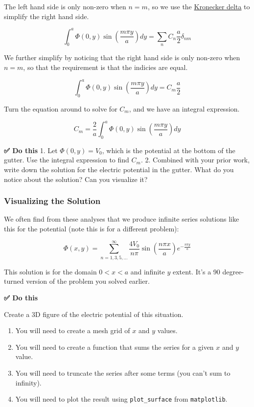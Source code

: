 The left hand side is only non-zero when \(n=m\), so we use the
\href{https://en.wikipedia.org/wiki/Kronecker_delta}{Kronecker delta} to
simplify the right hand side.

\[\int_0^a \Phi(0,y) \sin\left(\dfrac{m\pi y}{a}\right) dy = \sum_n C_n \dfrac{a}{2}\delta_{nm}\]

We further simplify by noticing that the right hand side is only
non-zero when \(n=m\), so that the requirement is that the indicies are
equal.

\[\int_0^a \Phi(0,y) \sin\left(\dfrac{m\pi y}{a}\right) dy = C_m \dfrac{a}{2}\]

Turn the equation around to solve for \(C_m\), and we have an integral
expression.

\[C_m = \dfrac{2}{a}\int_0^a \Phi(0,y) \sin\left(\dfrac{m\pi y}{a}\right) dy\]

\textbf{✅ Do this} 1. Let \(\Phi(0,y) = V_0\), which is the potential
at the bottom of the gutter. Use the integral expression to find
\(C_m\). 2. Combined with your prior work, write down the solution for
the electric potential in the gutter. What do you notice about the
solution? Can you visualize it?

\subsubsection{Visualizing the Solution}\label{visualizing-the-solution}

We often find from these analyses that we produce infinite series
solutions like this for the potential (note this is for a different
problem):

\[\Phi(x,y) = \sum_{n=1,3,5,\dots}^{\infty} \dfrac{4V_0}{n\pi} \sin\left(\dfrac{n\pi x}{a}\right) e^{-\frac{n\pi y}{a}}\]

This solution is for the domain \(0< x< a\) and infinite \(y\) extent.
It's a 90 degree-turned version of the problem you solved earlier.

\textbf{✅ Do this}

Create a 3D figure of the electric potential of this situation.

\begin{enumerate}
\def\labelenumi{\arabic{enumi}.}
\tightlist
\item
  You will need to create a mesh grid of \(x\) and \(y\) values.
\item
  You will need to create a function that sums the series for a given
  \(x\) and \(y\) value.
\item
  You will need to truncate the series after some terms (you can't sum
  to infinity).
\item
  You will need to plot the result using \texttt{plot\_surface} from
  \texttt{matplotlib}.
\end{enumerate}

